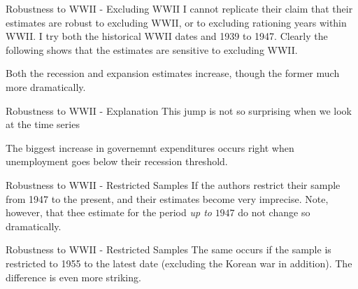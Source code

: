 \documentclass{beamer}
\begin{document}
\begin{frame}{Robustness to WWII - Excluding WWII}
  I cannot replicate their claim that their estimates are robust to excluding WWII, or to excluding rationing years within WWII. I try both the historical WWII dates and 1939 to 1947. Clearly the following shows that the estimates are sensitive to excluding WWII.
  \begin{figure}[ht!]
    \centering
    \label{fig:wwiirobustness_excluson}
  \end{figure}

  Both the recession and expansion estimates increase, though the former much more dramatically.
\end{frame}

\begin{frame}{Robustness to WWII - Explanation}
  This jump is not so surprising when we look at the time series
  \begin{figure}[ht!]
    \centering
    \label{fig:wwiirobustness_why}
  \end{figure}

  The biggest increase in governemnt expenditures occurs right when unemployment goes below their recession threshold.
\end{frame}

\begin{frame}{Robustness to WWII - Restricted Samples}
  If the authors restrict their sample from 1947 to the present, and their estimates become very imprecise. Note, however, that thee estimate for the period \textit{up to} $1947$ do not change so dramatically.
  \begin{figure}[ht!]
    \centering
    \label{fig:wwiirobustness_1947}
  \end{figure}
\end{frame}

\begin{frame}{Robustness to WWII - Restricted Samples}
  The same occurs if the sample is restricted to 1955 to the latest date (excluding the Korean war in addition). The difference is even more striking.
  \begin{figure}[ht!]
    \centering
    \label{fig:wwiirobustness_1955}
  \end{figure}
\end{frame}
\end{document}
